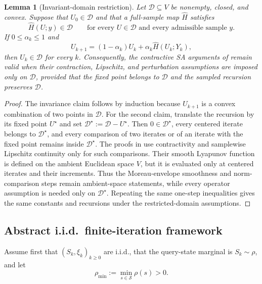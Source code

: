 \documentclass{article}
\newtheorem{lemma}[theorem]{Lemma}
\newcommand{\X}{\mathcal{S}}
\begin{document}
\begin{lemma}[Invariant-domain restriction]
\label{lem:invariant-domain}
Let $\mathcal D\subseteq V$ be nonempty, closed, and convex. Suppose that $U_0\in\mathcal D$ and that a full-sample map $\widehat H$ satisfies
\begin{equation}
\widehat H(U;y)\in\mathcal D \qquad\text{for every }U\in\mathcal D\text{ and every admissible sample }y.
\end{equation}
If $0\le\alpha_k\le1$ and
\begin{equation}
U_{k+1}=(1-\alpha_k)U_k+\alpha_k\widehat H(U_k;Y_k),
\end{equation}
then $U_k\in\mathcal D$ for every $k$. Consequently, the contractive SA arguments of \citet{chen2020finite,chen2024lyapunov} remain valid when their contraction, Lipschitz, and perturbation assumptions are imposed only on $\mathcal D$, provided that the fixed point belongs to $\mathcal D$ and the sampled recursion preserves $\mathcal D$.
\end{lemma}

\begin{proof}
The invariance claim follows by induction because $U_{k+1}$ is a convex combination of two points in $\mathcal D$. For the second claim, translate the recursion by its fixed point $U^\star$ and set $\mathcal D^\star:=\mathcal D-U^\star$. Then $0\in\mathcal D^\star$, every centered iterate belongs to $\mathcal D^\star$, and every comparison of two iterates or of an iterate with the fixed point remains inside $\mathcal D^\star$. The proofs in \citet{chen2020finite,chen2024lyapunov} use contractivity and samplewise Lipschitz continuity only for such comparisons. Their smooth Lyapunov function is defined on the ambient Euclidean space $V$, but it is evaluated only at centered iterates and their increments. Thus the Moreau-envelope smoothness and norm-comparison steps remain ambient-space statements, while every operator assumption is needed only on $\mathcal D^\star$. Repeating the same one-step inequalities gives the same constants and recursions under the restricted-domain assumptions.
\end{proof}

\subsection{Abstract i.i.d.\ finite-iteration framework}

Assume first that $(S_k,\xi_k)_{k\ge 0}$ are i.i.d., that the query-state marginal is $S_k\sim\rho$, and let
\begin{equation}
\rho_{\min} := \min_{s\in \X}\rho(s) > 0.
\end{equation}
\end{document}
